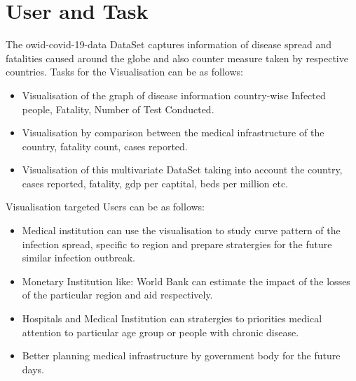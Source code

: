 \documentclass[10pt]{article}
\begin{document}
\section{User and Task}
The owid-covid-19-data DataSet captures information of disease spread  and fatalities caused around the globe and also counter measure taken by respective countries.\newline
Tasks for the Visualisation can be as follows:
\begin{itemize}
    \item Visualisation of the graph of disease information country-wise Infected people, Fatality, Number of Test Conducted.
    \item Visualisation by comparison between the medical infrastructure of the country, fatality count, cases reported.
    \item Visualisation of this multivariate DataSet taking into account the country, cases reported, fatality, gdp per captital, beds per million etc.
\end{itemize}
Visualisation targeted Users can be as follows:
\begin{itemize}
    \item Medical institution can use the visualisation to study curve pattern of the infection spread, specific to region and prepare stratergies for the future similar infection outbreak.
    \item Monetary Institution like: World Bank can estimate the impact of the losses of the particular region and aid respectively.
    \item Hospitals and Medical Institution can stratergies to priorities  medical attention to particular age group or people with chronic disease.
    \item Better planning medical infrastructure by government body for the future days.
\end{itemize}
\end{document}
